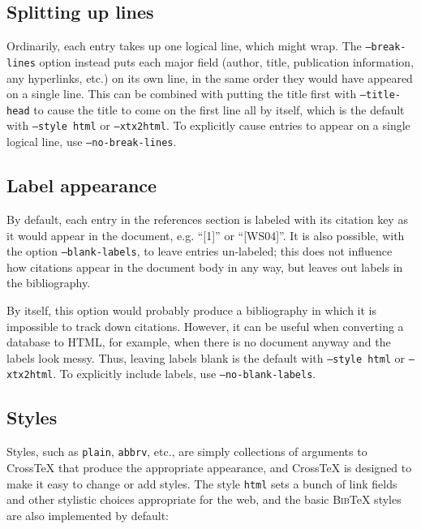 \documentclass{article}
\newcommand{\XTX}{Cross\TeX}
\newcommand{\BibTeX}{\textsc{Bib}\TeX}
\begin{document}
\subsection{Splitting up lines}

Ordinarily, each entry takes up one logical line, which might wrap.
The \texttt{--break-lines} option instead puts each major field (author,
title, publication information, any hyperlinks, etc.) on its own line,
in the same order they would have appeared on a single line.  This can be
combined with putting the title first with \texttt{--title-head} to cause
the title to come on the first line all by itself, which is the default
with \texttt{--style~html} or \texttt{--xtx2html}.  To explicitly cause
entries to appear on a single logical line, use \texttt{--no-break-lines}.

\subsection{Label appearance}

By default, each entry in the references section is labeled with
its citation key as it would appear in the document, e.g. ``[1]'' or
``[WS04]''.  It is also possible, with the option \texttt{--blank-labels},
to leave entries un-labeled; this does not influence how citations
appear in the document body in any way, but leaves out labels in the
bibliography.

By itself, this option would probably produce a bibliography in which it
is impossible to track down citations.  However, it can be useful when
converting a database to HTML, for example, when there is no document
anyway and the labels look messy.  Thus, leaving labels blank is the
default with \texttt{--style~html} or \texttt{--xtx2html}.  To explicitly
include labels, use \texttt{--no-blank-labels}.

\subsection{Styles}

Styles, such as \texttt{plain}, \texttt{abbrv}, etc., are simply
collections of arguments to \XTX{} that produce the appropriate
appearance, and \XTX{} is designed to make it easy to change or add
styles.  The style \texttt{html} sets a bunch of link fields and other
stylistic choices appropriate for the web, and the basic \BibTeX{}
styles are also implemented by default:
\end{document}
